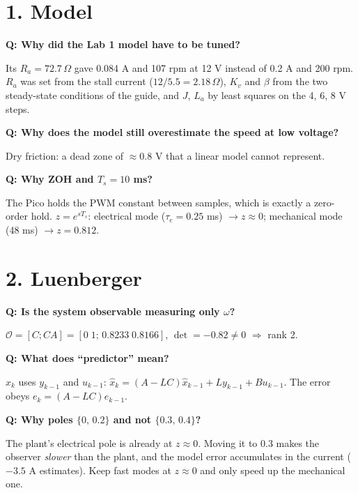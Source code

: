 \documentclass[9pt,a4paper,twocolumn]{extarticle}
\newcommand{\q}[1]{\par\smallskip\noindent\textbf{Q: #1}\par\noindent}
\begin{document}

\section{1. Model}
\q{Why did the Lab 1 model have to be tuned?}
Its $R_a=72.7\,\Omega$ gave 0.084 A and 107 rpm at 12 V instead of 0.2 A and 200 rpm. $R_a$ was set from the stall current ($12/5.5=2.18\,\Omega$), $K_v$ and $\beta$ from the two steady-state conditions of the guide, and $J$, $L_a$ by least squares on the 4, 6, 8 V steps.
\q{Why does the model still overestimate the speed at low voltage?}
Dry friction: a dead zone of $\approx0.8$ V that a linear model cannot represent.
\q{Why ZOH and $T_s=10$ ms?}
The Pico holds the PWM constant between samples, which is exactly a zero-order hold. $z=e^{sT_s}$: electrical mode ($\tau_e=0.25$ ms) $\to z\approx0$; mechanical mode (48 ms) $\to z=0.812$.

\section{2. Luenberger}
\q{Is the system observable measuring only $\omega$?}
$\mathcal{O}=[C;CA]=[0\;1;\,0.8233\;0.8166]$, $\det=-0.82\neq0$ $\Rightarrow$ rank 2.
\q{What does ``predictor'' mean?}
$\hat{x}_k$ uses $y_{k-1}$ and $u_{k-1}$: $\hat{x}_k=(A-LC)\hat{x}_{k-1}+Ly_{k-1}+Bu_{k-1}$. The error obeys $e_k=(A-LC)e_{k-1}$.
\q{Why poles $\{0,\,0.2\}$ and not $\{0.3,\,0.4\}$?}
The plant's electrical pole is already at $z\approx0$. Moving it to 0.3 makes the observer \emph{slower} than the plant, and the model error accumulates in the current ($-3.5$ A estimates). Keep fast modes at $z\approx0$ and only speed up the mechanical one.
\end{document}
